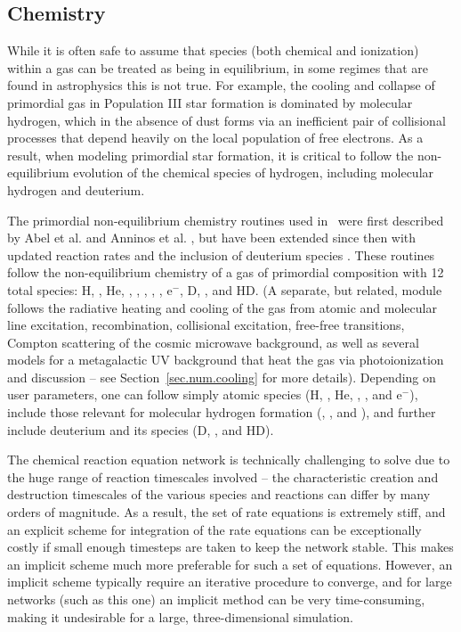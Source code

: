 \subsection{Chemistry}
\label{sec.num.chemistry}

While it is often safe to assume that species (both chemical and
ionization) within a gas can be treated as being in equilibrium, in
some regimes that are found in astrophysics this is not true.  For
example, the cooling and collapse of primordial gas in Population III
star formation is dominated by molecular hydrogen, which in the
absence of dust forms via an inefficient pair of collisional processes
that depend heavily on the local population of free electrons.  As a
result, when modeling primordial star formation, it is critical to
follow the non-equilibrium evolution of the chemical species of
hydrogen, including molecular hydrogen and deuterium.

The primordial non-equilibrium chemistry routines used in \enzo\ were
first described by Abel et al. and Anninos et
al. \citep{abel97,anninos97}, but have been extended since then with
updated reaction rates and the inclusion of deuterium species
\citep{2009PhDT.........5T}.  These routines follow the
non-equilibrium chemistry of a gas of primordial composition with 12
total species: H, \Hp, He, \Hep, \Hepp, \Hm, \HHp, \HH, e$^-$, D, \Dp,
and HD.  (A separate, but related, module follows the radiative
heating and cooling of the gas from atomic and molecular line
excitation, recombination, collisional excitation, free-free
transitions, Compton scattering of the cosmic microwave background, as
well as several models for a metagalactic UV background that heat the
gas via photoionization and discussion -- see
Section~\ref{sec.num.cooling} for more details).  Depending on user
parameters, one can follow simply atomic species (H, \Hp, He, \Hep,
\Hepp, and e$^-$), include those relevant for molecular hydrogen
formation (\HH, \HHp, and \Hm), and further include deuterium and its
species (D, \Dp, and HD).  

The chemical reaction equation network is technically challenging to
solve due to the huge range of reaction timescales involved -- the
characteristic creation and destruction timescales of the various
species and reactions can differ by many orders of magnitude.  As a
result, the set of rate equations is extremely stiff, and an explicit
scheme for integration of the rate equations can be exceptionally
costly if small enough timesteps are taken to keep the network stable.
This makes an implicit scheme much more preferable for such a set of
equations.  However, an implicit scheme typically require an iterative
procedure to converge, and for large networks (such as this one) an
implicit method can be very time-consuming, making it undesirable for
a large, three-dimensional simulation.

